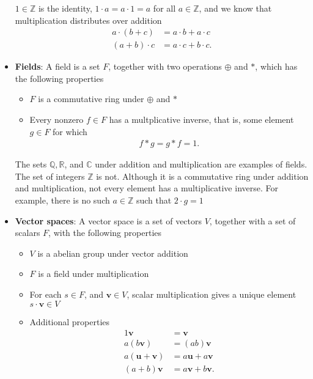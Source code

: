 \documentclass{report}
\begin{document}
\begin{itemize}
            \bigbreak \noindent 
            $1\in \mathbb{Z}$ is the identity, $1 \cdot a = a \cdot 1 =a$ for all $a\in \mathbb{Z} $, and we know that multiplication distributes over addition
            \begin{align*}
                a \cdot (b+c) &= a\cdot b + a\cdot c \\
                (a+b) \cdot c &= a\cdot c + b\cdot c
            .\end{align*}
        \item \textbf{Fields}: A field is a set $F$, together with two operations $\oplus$ and $* $, which has the following properties
            \begin{itemize}
                \item $F$ is a commutative ring under $\oplus$ and $* $ 
                \item Every nonzero $f\in F$ has a multplicative inverse, that is, some element $g\in F$ for which
                    \begin{align*}
                        f*g = g*f = 1
                    .\end{align*}
            \end{itemize}
            The sets $\mathbb{Q}, \mathbb{R}$, and $\mathbb{C}$ under addition and multiplication are examples of fields. The set of integers $\mathbb{Z}$ is not. Although it is a commutative ring under addition and multiplication, not every element has a multiplicative inverse. For example, there is no such $a\in \mathbb{Z}$ such that $2 \cdot  g = 1 $
        \item \textbf{Vector spaces}: A vector space is a set of vectors $V$, together with a set of scalars $F$, with the following properties
            \begin{itemize}
                \item $V$ is a abelian group under vector addition
                \item  $F$ is a field under multiplication
                \item For each $s\in F$, and $\mathbf{v}\in V$, scalar multiplication gives a unique element $s\cdot \mathbf{v} \in V $
                \item Additional properties
                    \begin{align*}
                        1\mathbf{v} &= \mathbf{v} \\
                        a(b\mathbf{v}) &= (ab)\mathbf{v} \\
                        a(\mathbf{u} + \mathbf{v}) &= a\mathbf{u} + a\mathbf{v} \\
                        (a+b) \mathbf{v} &= a\mathbf{v} + b\mathbf{v}
                    .\end{align*}
            \end{itemize}



    \end{itemize}
\end{document}
